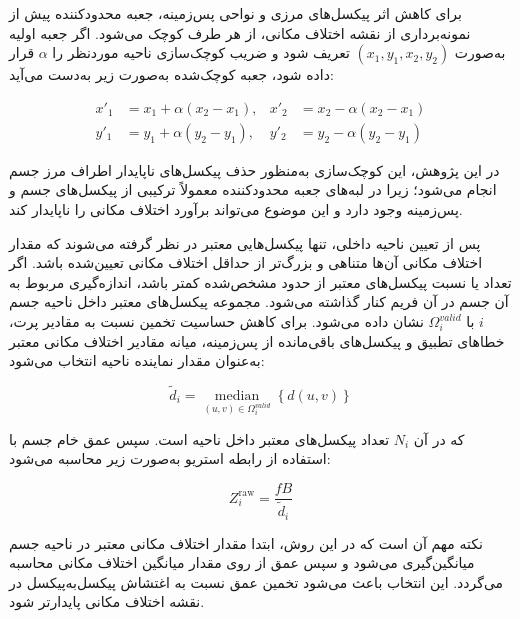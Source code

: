 برای کاهش اثر پیکسل‌های مرزی و نواحی پس‌زمینه، جعبه محدودکننده پیش از نمونه‌برداری از نقشه اختلاف مکانی، از هر طرف کوچک می‌شود. اگر جعبه اولیه به‌صورت \((x_1,y_1,x_2,y_2)\) تعریف شود و ضریب کوچک‌سازی ناحیه موردنظر را \(\alpha\) قرار داده شود، جعبه کوچک‌شده به‌صورت زیر به‌دست می‌آید:

\begin{equation}
	\begin{aligned}
		x'_1 &= x_1 + \alpha(x_2-x_1), &
		x'_2 &= x_2 - \alpha(x_2-x_1) \\
		y'_1 &= y_1 + \alpha(y_2-y_1), &
		y'_2 &= y_2 - \alpha(y_2-y_1)
	\end{aligned}
	\label{eq:roi_shrink}
\end{equation}

در این پژوهش، این کوچک‌سازی به‌منظور حذف پیکسل‌های ناپایدار اطراف مرز جسم انجام می‌شود؛ زیرا در لبه‌های جعبه محدودکننده معمولاً ترکیبی از پیکسل‌های جسم و پس‌زمینه وجود دارد و این موضوع می‌تواند برآورد اختلاف مکانی را ناپایدار کند.

پس از تعیین ناحیه داخلی، تنها پیکسل‌هایی معتبر در نظر گرفته می‌شوند
که مقدار اختلاف مکانی آن‌ها متناهی و بزرگ‌تر از حداقل اختلاف مکانی
تعیین‌شده باشد. اگر تعداد یا نسبت پیکسل‌های معتبر از حدود مشخص‌شده
کمتر باشد، اندازه‌گیری مربوط به آن جسم در آن فریم کنار گذاشته می‌شود.
مجموعه پیکسل‌های معتبر داخل ناحیه جسم \(i\) با
\(\Omega_i^{valid}\) نشان داده می‌شود. برای کاهش حساسیت تخمین نسبت
به مقادیر پرت، خطاهای تطبیق و پیکسل‌های باقی‌مانده از پس‌زمینه،
میانه مقادیر اختلاف مکانی معتبر به‌عنوان مقدار نماینده ناحیه انتخاب
می‌شود:

\begin{equation}
	\tilde{d}_i =
	\underset{(u,v)\in\Omega_i^{valid}}{\operatorname{median}}
	\left\{d(u,v)\right\}
	\label{eq:median_valid_disparity}
\end{equation}

که در آن \(N_i\) تعداد پیکسل‌های معتبر داخل ناحیه است. سپس عمق خام جسم با استفاده از رابطه استریو به‌صورت زیر محاسبه می‌شود:

\begin{equation}
	Z_i^{\mathrm{raw}} =
	\frac{fB}{\tilde{d}_i}
	\label{eq:obstacle_raw_depth}
\end{equation}

نکته مهم آن است که در این روش، ابتدا مقدار اختلاف مکانی معتبر در ناحیه جسم میانگین‌گیری می‌شود و سپس عمق از روی مقدار میانگین اختلاف مکانی محاسبه می‌گردد. این انتخاب باعث می‌شود تخمین عمق نسبت به اغتشاش پیکسل‌به‌پیکسل در نقشه اختلاف مکانی پایدارتر شود.

